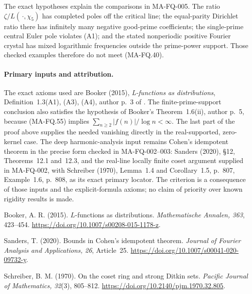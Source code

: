 The exact hypotheses explain the comparisons
in MA-FQ-005. The ratio $\zeta/L(\,\cdot,\chi_5)$
has completed poles off the critical line;
the equal-parity Dirichlet ratio there has
infinitely many negative good-prime coefficients;
the single-prime central Euler pole violates
(A1); and the stated nonperiodic positive
Fourier crystal has mixed logarithmic
frequencies outside the prime-power support.
Those checked examples therefore do not meet
(MA-FQ.40).

\paragraph{Primary inputs and attribution.}
The exact axioms used are Booker (2015),
\emph{L-functions as distributions},
Definition~1.3(A1), (A3), (A4), author p.~3
of .
The finite-prime-support conclusion also
satisfies the hypothesis of Booker's
Theorem~1.6(ii), author p.~5, because
(MA-FQ.55) implies
$\sum_{n\ge2}|f(n)|/\log n<\infty$.
The last part of the proof above supplies
the needed vanishing directly in the
real-supported, zero-kernel case.
The deep harmonic-analysis input remains
Cohen's idempotent theorem in the precise
form checked in MA-FQ-002--003:
Sanders (2020), \S12, Theorems~12.1 and~12.3,
and the real-line locally finite coset
argument supplied in MA-FQ-002, with
Schreiber (1970), Lemma~1.4 and
Corollary~1.5, p.~807, Example~1.6,
p.~808, as its exact primary locator.
The criterion is a consequence of those
inputs and the explicit-formula axioms;
no claim of priority over known rigidity
results is made.

Booker, A. R. (2015). $L$-functions as distributions.
\emph{Mathematische Annalen, 363}, 423--454.
\url{https://doi.org/10.1007/s00208-015-1178-z}.

Sanders, T. (2020). Bounds in Cohen's idempotent theorem.
\emph{Journal of Fourier Analysis and Applications, 26},
Article~25.
\url{https://doi.org/10.1007/s00041-020-09732-y}.

Schreiber, B. M. (1970). On the coset ring and strong Ditkin sets.
\emph{Pacific Journal of Mathematics, 32}(3), 805--812.
\url{https://doi.org/10.2140/pjm.1970.32.805}.
